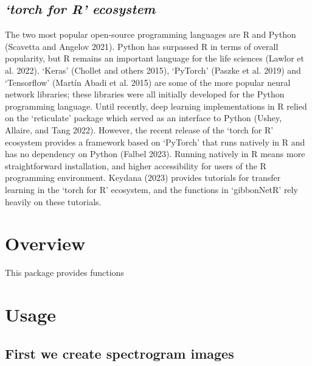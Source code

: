 \documentclass[fleqn,10pt,lineno]{wlpeerj} %
\begin{document}
\hypertarget{torch-for-r-ecosystem}{%
\subsection{\texorpdfstring{\emph{`torch for R'
ecosystem}}{`torch for R' ecosystem}}\label{torch-for-r-ecosystem}}

The two most popular open-source programming languages are R and Python
(Scavetta and Angelov 2021). Python has surpassed R in terms of overall
popularity, but R remains an important language for the life sciences
(Lawlor et al. 2022). `Keras' (Chollet and others 2015), `PyTorch'
(Paszke et al. 2019) and `Tensorflow' (Martín Abadi et al. 2015) are
some of the more popular neural network libraries; these libraries were
all initially developed for the Python programming language. Until
recently, deep learning implementations in R relied on the `reticulate'
package which served as an interface to Python (Ushey, Allaire, and Tang
2022). However, the recent release of the `torch for R' ecosystem
provides a framework based on `PyTorch' that runs natively in R and has
no dependency on Python (Falbel 2023). Running natively in R means more
straightforward installation, and higher accessibility for users of the
R programming environment. Keydana (2023) provides tutorials for
transfer learning in the `torch for R' ecosystem, and the functions in
`gibbonNetR' rely heavily on these tutorials.

\hypertarget{overview}{%
\section{Overview}\label{overview}}

This package provides functions

\hypertarget{usage}{%
\section{Usage}\label{usage}}

\hypertarget{first-we-create-spectrogram-images}{%
\subsection{First we create spectrogram
images}\label{first-we-create-spectrogram-images}}
\end{document}
